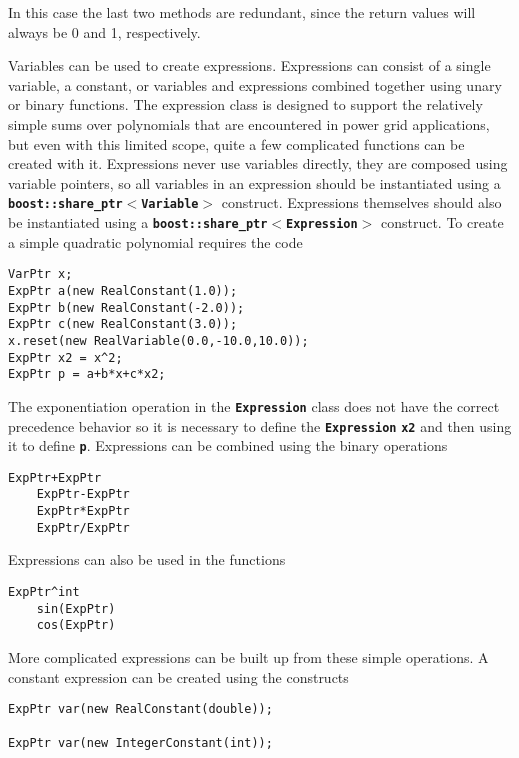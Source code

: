 In this case the last two methods are redundant, since the return values will always be 0 and 1, respectively.

Variables can be used to create expressions. Expressions can consist of a single variable, a constant, or variables and expressions combined together using unary or binary functions. The expression class is designed to support the relatively simple sums over polynomials that are encountered in power grid applications, but even with this limited scope, quite a few complicated functions can be created with it. Expressions never use variables directly, they are composed using variable pointers, so all variables in an expression should be instantiated using a \texttt{\textbf{boost::share\_ptr$\boldsymbol{\mathrm{<}}$Variable$\boldsymbol{\mathrm{>}}$}} construct. Expressions themselves should also be instantiated using a \texttt{\textbf{boost::share\_ptr$\boldsymbol{\mathrm{<}}$Expression$\boldsymbol{\mathrm{>}}$}} construct. To create a simple quadratic polynomial requires the code

{
\color{red}
\begin{Verbatim}[fontseries=b]
VarPtr x;
ExpPtr a(new RealConstant(1.0));
ExpPtr b(new RealConstant(-2.0));
ExpPtr c(new RealConstant(3.0));
x.reset(new RealVariable(0.0,-10.0,10.0));
ExpPtr x2 = x^2;
ExpPtr p = a+b*x+c*x2;
\end{Verbatim}
}

The exponentiation operation in the \texttt{\textbf{Expression}} class does not have the correct precedence behavior so it is necessary to define the \texttt{\textbf{Expression}} \texttt{\textbf{x2}} and then using it to define \texttt{\textbf{p}}. Expressions can be combined using the binary operations

{
\color{red}
\begin{Verbatim}[fontseries=b]
    ExpPtr+ExpPtr
    ExpPtr-ExpPtr
    ExpPtr*ExpPtr
    ExpPtr/ExpPtr
\end{Verbatim}
}

Expressions can also be used in the functions

{
\color{red}
\begin{Verbatim}[fontseries=b]
    ExpPtr^int
    sin(ExpPtr)
    cos(ExpPtr)
\end{Verbatim}
}

More complicated expressions can be built up from these simple operations. A constant expression can be created using the constructs

{
\color{red}
\begin{Verbatim}[fontseries=b]
ExpPtr var(new RealConstant(double));

ExpPtr var(new IntegerConstant(int));
\end{Verbatim}
}

